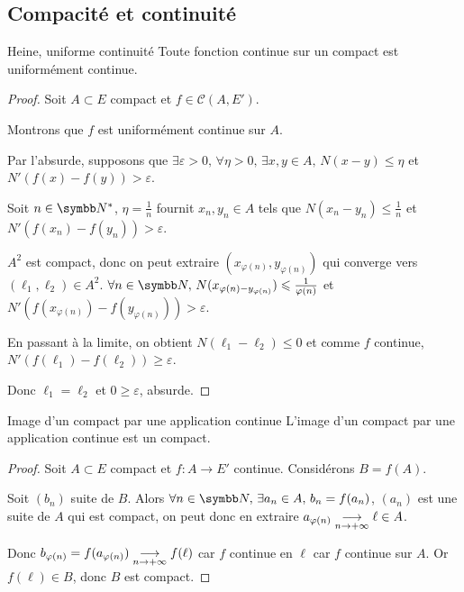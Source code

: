 \subsection{Compacité et continuité}

\begin{theoreme}{Heine, uniforme continuité}{}
    Toute fonction continue sur un compact est uniformément continue. 
\end{theoreme}


\begin{proof}
    Soit $A \subset E$ compact et $f \in \mathscr C(A, E')$. 

    Montrons que $f$ est uniformément continue sur $A$. 

    Par l'absurde, supposons que $\exists \varepsilon > 0, \, \forall \eta > 0, \, \exists x, y \in A, \, N(x - y) \leqslant \eta$ et $N'(f(x) - f(y)) > \varepsilon$.

    Soit $n \in \N^*$, $\eta = \frac 1 n$ fournit $x_n, y_n \in A$ tels que $N(x_n - y_n) \leqslant \frac 1 n$
    et $N'(f(x_n) - f(y_n)) > \varepsilon$.

    $A^2$ est compact, donc on peut extraire $(x_{\varphi(n)}, y_{\varphi(n)})$ qui converge vers $(\ell_1, \ell_2) \in A^2$.
    $\forall n \in \N, \, N(x_{\varphi(n) - y_{\varphi(n)}}) \leqslant \frac 1 {\varphi(n)}$ et $N'(f(x_{\varphi(n)}) - f(y_{\varphi(n)})) > \varepsilon$.

    En passant à la limite, on obtient $N(\ell_1 - \ell_2) \leqslant 0$ et comme $f$ continue, 
    $N'(f(\ell_1) - f(\ell_2)) \geqslant \varepsilon$.

    Donc $\ell_1 = \ell_2$ et $0 \geqslant \varepsilon$, absurde.
\end{proof}

\begin{theoreme}{Image d'un compact par une application continue}{}
    L'image d'un compact par une application continue est un compact. 
\end{theoreme}


\begin{proof}
    Soit $A \subset E$ compact et $f : A \to E'$ continue. Considérons $B = f(A)$. 

    Soit $(b_n)$ suite de $B$. Alors $\forall n \in \N, \, \exists a_n \in A, \, b_n = f(a_n)$,
    $(a_n)$ est une suite de $A$ qui est compact, on peut donc en extraire 
    $a_{\varphi(n)} \underset{n \to + \infty}{\longrightarrow} \ell \in A$. 

    Donc $b_{\varphi(n)} = f(a_{\varphi(n)}) \underset{n \to + \infty}{\longrightarrow} f(\ell) $ car $f$ continue en 
    $\ell$ car $f$ continue sur $A$. Or $f(\ell) \in B$, donc $B$ est compact.
\end{proof}

